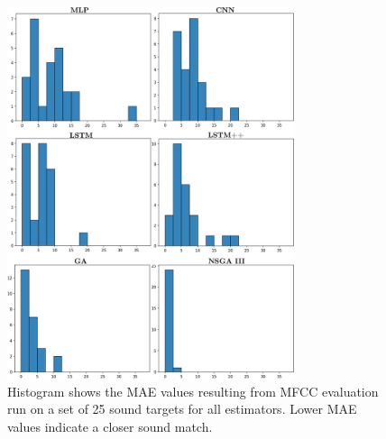 \begin{figure}[t]
\begin{center}
\includegraphics[width=0.75\textwidth]{hist_group_v3.png}
\caption{Histogram shows the MAE values resulting from MFCC evaluation run on a set of 25 sound targets for all estimators. Lower MAE values indicate a closer sound match.}
\label{fig:group_hist}
\end{center}
\end{figure}

